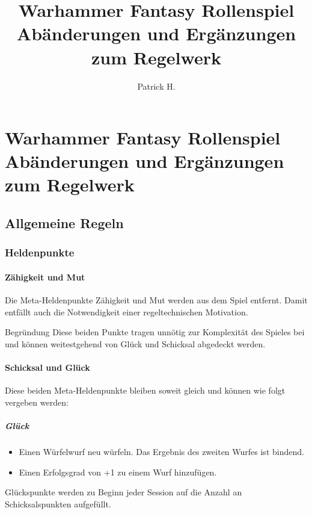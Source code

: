 \documentclass[a4paper,10pt,twoside,twocolumn,openany,nodeprecatedcode,bg=print]{dndbook}
\title{
  Warhammer Fantasy Rollenspiel\newline
  \large Abänderungen und Ergänzungen zum Regelwerk
  }
\author{Patrick H.}
\date{}
\begin{document}


\part*{Warhammer Fantasy Rollenspiel\newline
  \large{Abänderungen und Ergänzungen zum Regelwerk}\newline
}
\vspace{1em}



\chapter{Allgemeine Regeln}
\section{Heldenpunkte}
\subsection{Zähigkeit und Mut}
Die Meta-Heldenpunkte Zähigkeit und Mut werden aus dem Spiel entfernt.
Damit entfällt auch die Notwendigkeit einer regeltechnischen Motivation.

\begin{DndComment}{Begründung}
  Diese beiden Punkte tragen unnötig zur Komplexität des Spieles bei und können weitestgehend von Glück und Schicksal abgedeckt werden.
\end{DndComment}

\subsection{Schicksal und Glück}
Diese beiden Meta-Heldenpunkte bleiben soweit gleich und können wie folgt vergeben werden:
\subsubsection{Glück}
\begin{itemize}
  \item Einen Würfelwurf neu würfeln. Das Ergebnis des zweiten Wurfes ist bindend.
  \item Einen Erfolgsgrad von +1 zu einem Wurf hinzufügen.
\end{itemize}
Glückspunkte werden zu Beginn jeder Session auf die Anzahl an Schicksalspunkten aufgefüllt.
\end{document}
